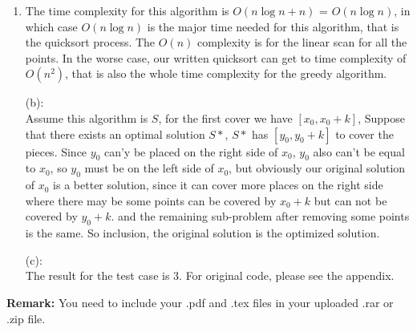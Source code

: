 \documentclass[12pt,a4paper]{article}
\makeatletter
\newtheorem*{solution}{Solution}
\theoremstyle{definition}
\renewenvironment{solution}[1][Solution] {\par\pushQED{\qed}\normalfont\topsep6\p@\@plus6\p@\relax\trivlist\item[\hskip\labelsep\bfseries#1\@addpunct{.}]\ignorespaces}{\popQED\endtrivlist\@endpefalse} \makeatother
\makeatother
\begin{document}
\begin{enumerate}
\begin{solution}
\begin{algorithm}[H]
%		
	\end{algorithm}

        The time complexity for this algorithm is $O\left( n \log n + n\right)$ = $O\left(n\log n\right)$, in which case $O\left(n\log n\right)$ is the
major time needed for this algorithm, that is the quicksort process. The $O\left(n\right)$ complexity is for the linear scan for all the points. In the worse case, our written quicksort can get to time complexity of $O\left(n^2\right)$, that is also the whole time complexity for the greedy algorithm.

        (b):\\
        
        Assume this algorithm is $S$, for the first cover we have $[x_0, x_0+k]$,  Suppose that there exists an optimal solution $S*$, $S*$ has $\left[y_0,y_0+k\right]$ to cover the pieces. Since $y_0$ can'y be placed on the right side of $x_0$, $y_0$ also can't be equal to $x_0$, so $y_0$ must be on the left side of $x_0$, but obviously our original solution of $x_0$ is a better solution, since it can cover more places on the right side where there may be some points can be covered by $x_0+k$ but can not be covered by $y_0+k$. and the remaining sub-problem after removing some points is the same. So inclusion, the original solution is the optimized solution. 
        
        (c):\\
        
        The result for the test case is 3. For original code, please see the appendix. 
        

    \end{solution}

\end{enumerate}



\vspace{20pt}

\textbf{Remark:} You need to include your .pdf and .tex files in your uploaded .rar or .zip file.

\end{document}
